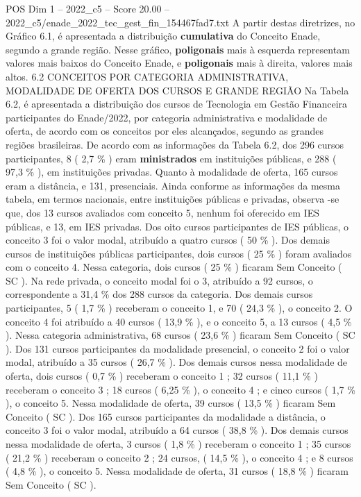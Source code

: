 \begin{textsample}{POS Dim 1 – 2022\_c5 – Score 20.00 – 2022\_c5/enade\_2022\_tec\_gest\_fin\_154467fad7.txt}
A partir destas diretrizes, no Gráfico 6.1, é apresentada a distribuição \textbf{cumulativa} do Conceito Enade, segundo a grande região.
Nesse gráfico, \textbf{poligonais} mais à esquerda representam valores mais baixos do Conceito Enade, e \textbf{poligonais} mais à direita, valores mais altos. 6.2 CONCEITOS POR CATEGORIA ADMINISTRATIVA, MODALIDADE DE OFERTA DOS CURSOS E GRANDE REGIÃO Na Tabela 6.2, é apresentada a distribuição dos cursos de Tecnologia em Gestão Financeira participantes do Enade/2022, por categoria administrativa e modalidade de oferta, de acordo com os conceitos por eles alcançados, segundo as grandes regiões brasileiras.
De acordo com as informações da Tabela 6.2, dos 296 cursos participantes, 8 ( 2,7 \% ) eram \textbf{ministrados} em instituições públicas, e 288 ( 97,3 \% ), em instituições privadas.
Quanto à modalidade de oferta, 165 cursos eram a distância, e 131, presenciais.
Ainda conforme as informações da mesma tabela, em termos nacionais, entre instituições públicas e privadas, observa -se que, dos 13 cursos avaliados com conceito 5, nenhum foi oferecido em IES públicas, e 13, em IES privadas.
Dos oito cursos participantes de IES públicas, o conceito 3 foi o valor modal, atribuído a quatro cursos ( 50 \% ).
Dos demais cursos de instituições públicas participantes, dois cursos ( 25 \% ) foram avaliados com o conceito 4.
Nessa categoria, dois cursos ( 25 \% ) ficaram Sem Conceito ( SC ).
Na rede privada, o conceito modal foi o 3, atribuído a 92 cursos, o correspondente a 31,4 \% dos 288 cursos da categoria.
Dos demais cursos participantes, 5 ( 1,7 \% ) receberam o conceito 1, e 70 ( 24,3 \% ), o conceito 2.
O conceito 4 foi atribuído a 40 cursos ( 13,9 \% ), e o conceito 5, a 13 cursos ( 4,5 \% ).
Nessa categoria administrativa, 68 cursos ( 23,6 \% ) ficaram Sem Conceito ( SC ).
Dos 131 cursos participantes da modalidade presencial, o conceito 2 foi o valor modal, atribuído a 35 cursos ( 26,7 \% ).
Dos demais cursos nessa modalidade de oferta, dois cursos ( 0,7 \% ) receberam o conceito 1 ; 32 cursos ( 11,1 \% ) receberam o conceito 3 ; 18 cursos ( 6,25 \% ), o conceito 4 ; e cinco cursos ( 1,7 \% ), o conceito 5.
Nessa modalidade de oferta, 39 cursos ( 13,5 \% ) ficaram Sem Conceito ( SC ).
Dos 165 cursos participantes da modalidade a distância, o conceito 3 foi o valor modal, atribuído a 64 cursos ( 38,8 \% ).
Dos demais cursos nessa modalidade de oferta, 3 cursos ( 1,8 \% ) receberam o conceito 1 ; 35 cursos ( 21,2 \% ) receberam o conceito 2 ; 24 cursos, ( 14,5 \% ), o conceito 4 ; e 8 cursos ( 4,8 \% ), o conceito 5.
Nessa modalidade de oferta, 31 cursos ( 18,8 \% ) ficaram Sem Conceito ( SC ).

\end{textsample}
